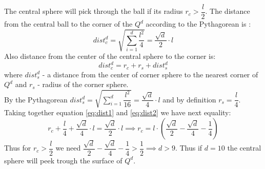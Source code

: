 The central sphere will pick through the ball if its radius $r_c > \dfrac{l}{2}$.
The distance from the central ball to the corner of the $Q^d$ according to the 
Pythagorean is :
\begin{equation}
dist^d_c = \sqrt{\sum_{i=1}^d \dfrac{l^2}{4}} = \dfrac{\sqrt{d}}{2} \cdot l\label{eq:dist1}
\end{equation}
Also distance from the center of the central sphere to the corner is:
\begin{equation}
dist^d_c = r_c + r_s + dist_s^d\label{eq:dist2}
\end{equation}
where $dist_s^d$ - a distance from the center of corner sphere to the nearest corner of $Q^d$ and
			$r_s$ - radius of the corner sphere.\\
By the Pythagorean $dist_s^d = \sqrt{\sum_{i=1}^d \dfrac{l^2}{16}} = \dfrac{\sqrt{d}}{4}\cdot l$ 
and by definition $r_s = \dfrac{l}{4}$. Taking together equation \eqref{eq:dist1} and \eqref{eq:dist2} we have next equality:
\begin{equation}
r_c + \dfrac{l}{4} + \dfrac{\sqrt{d}}{4}\cdot l = \dfrac{\sqrt{d}}{2} \cdot l \implies r_c = l\cdot \left(\dfrac{\sqrt{d}}{2} - \dfrac{\sqrt{d}}{4} - \dfrac{1}{4} \right)
\end{equation} 
Thus for $r_c > \dfrac{l}{2}$ we need 
$\dfrac{\sqrt{d}}{2} - \dfrac{\sqrt{d}}{4} - \dfrac{1}{4} > \dfrac{1}{2} \implies d > 9$. Thus if $d = 10$ 
the central sphere will peek trough the surface of $Q^d$. 